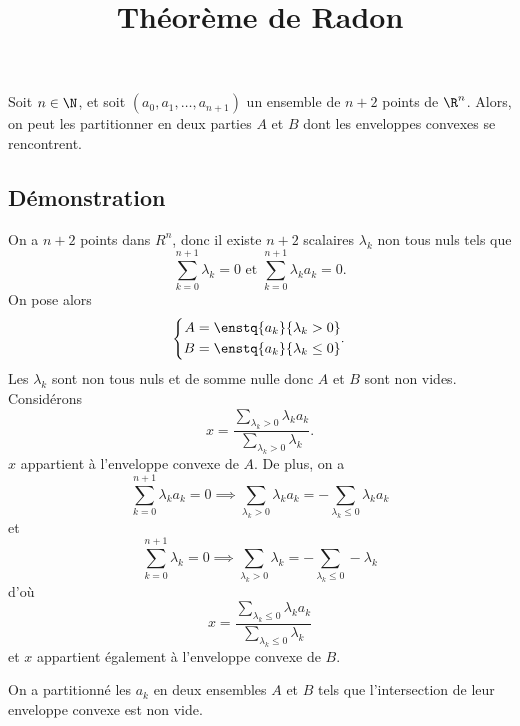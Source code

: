 \documentclass[fontsize=12pt,twoside=false,parskip=half, french]{scrartcl}
\title{Théorème de Radon}
\date{}
\author{}
\begin{document}
\maketitle
   \begin{Theoreme}
      Soit $n \in \N$, et soit $(a_0, a_1, \ldots, a_{n + 1})$ un ensemble de
      $n + 2$ points de $\R^n$. Alors, on peut les partitionner en deux parties
      $A$ et $B$ dont les enveloppes convexes se rencontrent.
   \end{Theoreme}
   \subsection{Démonstration}
      On a $n + 2$ points dans $R^n$, donc il existe $n + 2$ scalaires $\lambda_k$
      non tous nuls tels que 
      \[
         \sum_{k = 0}^{n + 1} \lambda_k = 0 \text{ et } 
         \sum_{k = 0}^{n + 1} \lambda_ka_k = 0.
      \]
      On pose alors
      \[
      \left\{
      \begin{aligned}
         A &= \enstq{a_k}{\lambda_k > 0}\\
         B &= \enstq{a_k}{\lambda_k \leq 0}
      \end{aligned}.\right.
      \]
      Les $\lambda_k$ sont non tous nuls et de somme nulle donc $A$ et $B$ sont 
      non vides. Considérons
      \[
         x = \frac{\sum_{\lambda_k > 0} \lambda_ka_k}{\sum_{\lambda_k > 0} \lambda_k}.
      \]
      $x$ appartient à l'enveloppe convexe de $A$. De plus, on a
      \[
         \sum_{k = 0}^{n + 1} \lambda_ka_k = 0 \implies 
         \sum_{\lambda_k > 0} \lambda_ka_k = -\sum_{\lambda_k \leq 0} \lambda_ka_k
      \]
      et
      \[
         \sum_{k = 0}^{n + 1} \lambda_k = 0 \implies 
         \sum_{\lambda_k > 0} \lambda_k = -\sum_{\lambda_k \leq 0} -\lambda_k
      \]
      d'où 
      \[
         x = \frac{\sum_{\lambda_k \leq 0} \lambda_ka_k}{\sum_{\lambda_k \leq 0} \lambda_k}
      \]
      et $x$ appartient également à l'enveloppe convexe de $B$.
      
      On a partitionné les $a_k$ en deux ensembles $A$ et $B$ tels que l'intersection
      de leur enveloppe convexe est non vide.
\end{document}

